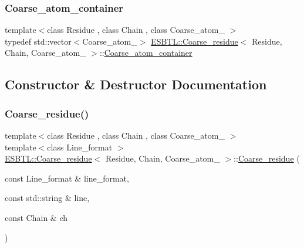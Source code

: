 \subsubsection{\texorpdfstring{Coarse\+\_\+atom\+\_\+container}{Coarse\_atom\_container}}
{\footnotesize\ttfamily template$<$class Residue , class Chain , class Coarse\+\_\+atom\+\_\+ $>$ \\
typedef std\+::vector$<$Coarse\+\_\+atom\+\_\+$>$ \hyperlink{classESBTL_1_1Coarse__residue}{E\+S\+B\+T\+L\+::\+Coarse\+\_\+residue}$<$ Residue, Chain, Coarse\+\_\+atom\+\_\+ $>$\+::\hyperlink{classESBTL_1_1Coarse__residue_ac1fa9270ab6914abefb8e63ceeb5ba1f}{Coarse\+\_\+atom\+\_\+container}}



\subsection{Constructor \& Destructor Documentation}
\mbox{\label{classESBTL_1_1Coarse__residue_aebedf19bfbb8c04f7413b1618bc5dd32}} 
\subsubsection{\texorpdfstring{Coarse\+\_\+residue()}{Coarse\_residue()}\hspace{0.1cm}{\footnotesize\ttfamily [1/2]}}
{\footnotesize\ttfamily template$<$class Residue , class Chain , class Coarse\+\_\+atom\+\_\+ $>$ \\
template$<$class Line\+\_\+format $>$ \\
\hyperlink{classESBTL_1_1Coarse__residue}{E\+S\+B\+T\+L\+::\+Coarse\+\_\+residue}$<$ Residue, Chain, Coarse\+\_\+atom\+\_\+ $>$\+::\hyperlink{classESBTL_1_1Coarse__residue}{Coarse\+\_\+residue} (\begin{DoxyParamCaption}\item[{const Line\+\_\+format \&}]{line\+\_\+format,  }\item[{const std\+::string \&}]{line,  }\item[{const Chain \&}]{ch }\end{DoxyParamCaption})\hspace{0.3cm}{\ttfamily [inline]}}

